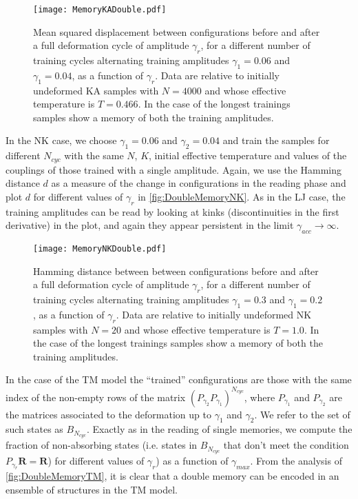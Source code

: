 \begin{figure} 
\centering 
\texttt{[image: MemoryKADouble.pdf]} 
\caption{Mean squared displacement between configurations before and after a full deformation cycle of amplitude $\gamma_{r}$, for a different number of training cycles alternating training amplitudes $\gamma_{1} = 0.06$ and $\gamma_{1} = 0.04$, as a function of $\gamma_{r}$. Data are relative to initially undeformed KA samples with $N=4000$ and whose effective temperature is $T=0.466$. In the case of the longest trainings samples show a memory of both the training amplitudes. \label{fig:DoubleMemoryLJ}}
\end{figure}
In the NK case, we choose $\gamma_{1} = 0.06$ and $\gamma_{2} = 0.04$ and train the samples for different $N_{cyc}$ with the same $N$, $K$, initial effective temperature and values of the couplings of those trained with a single amplitude. Again, we use the Hamming distance $d$ as a measure of the change in configurations in the reading phase and plot $d$ for different values of $\gamma_{r}$ in \autoref{fig:DoubleMemoryNK}. As in the LJ case, the training amplitudes can be read by looking at kinks (discontinuities in the first derivative) in the plot, and again they appear persistent in the limit $\gamma_{acc} \rightarrow \infty$.

\begin{figure} 
\centering 
\texttt{[image: MemoryNKDouble.pdf]} 
\caption{Hamming distance between between configurations before and after a full deformation cycle of amplitude $\gamma_{r}$, for a different number of training cycles alternating training amplitudes $\gamma_{1} = 0.3$ and $\gamma_{1} = 0.2$, as a function of $\gamma_{r}$. Data are relative to initially undeformed NK samples with $N=20$ and whose effective temperature is $T=1.0$. In the case of the longest trainings samples show a memory of both the training amplitudes. \label{fig:DoubleMemoryNK}}
\end{figure}

In the case of the TM model the ``trained'' configurations are those with the same index of the non-empty rows of the matrix $(P_{\gamma_{2}} P_{\gamma_{1}})^{N_{cyc}}$, where $P_{\gamma_{1}}$ and $P_{\gamma_{2}}$ are the matrices associated to the deformation up to $\gamma_{1}$ and $\gamma_{2}$. We refer to the set of such states as $B_{N_{cyc}}$. Exactly as in the reading of single memories, we compute the fraction of non-absorbing states (i.e. states in $B_{N_{cyc}}$ that don't meet the condition $P_{\gamma_{r}} \mathbf{R} = \mathbf{R}$) for different values of $\gamma_{r}$) as a function of $\gamma_{max}$.
From the analysis of \autoref{fig:DoubleMemoryTM}, it is clear that a double memory can be encoded in an ensemble of structures in the TM model.

